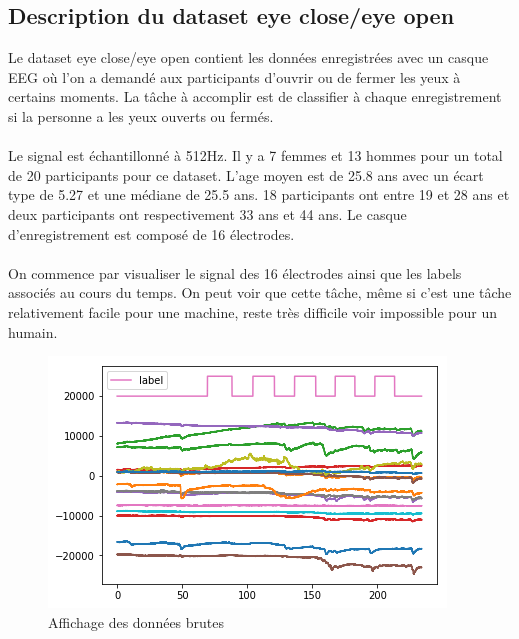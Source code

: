 \documentclass{article}[12pt]
\begin{document}
\subsection{Description du dataset eye close/eye open}
Le dataset eye close/eye open contient les données enregistrées avec un casque EEG où l'on a demandé aux participants d'ouvrir ou de fermer les yeux à certains moments. La tâche à accomplir est de classifier à chaque enregistrement si la personne a les yeux ouverts ou fermés.\\
\\
Le signal est échantillonné à 512Hz. Il y a 7 femmes et 13 hommes pour un total de 20 participants pour ce dataset. L'age moyen est de 25.8 ans avec un écart type de 5.27 et une médiane de 25.5 ans. 18 participants ont entre 19 et 28 ans et deux participants ont respectivement 33 ans et 44 ans. Le casque d'enregistrement est composé de 16 électrodes.\\
\\
On commence par visualiser le signal des 16 électrodes ainsi que les labels associés au cours du temps. On peut voir que cette tâche, même si c'est une tâche relativement facile pour une machine, reste très difficile voir impossible pour un humain.\\
\begin{figure}[H]
\begin{center}
\includegraphics[scale=0.8]{images/donnees_entree.png}
\end{center}
\caption{Affichage des données brutes}
\end{figure}
\end{document}
